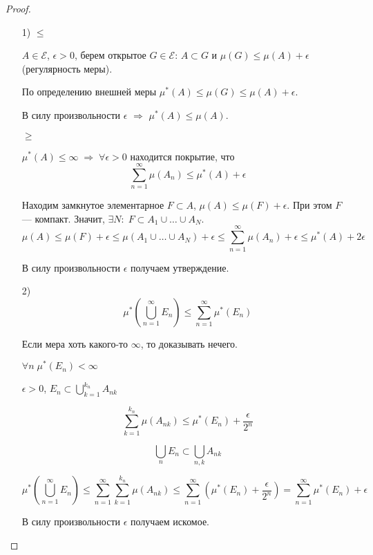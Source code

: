 \begin{proof}
  \phantom{123}\par
  \begin{itemize}
  \item[1)] \textbf{$\leq$} 
  
  $A \in \mathcal{E}$, $\epsilon > 0$, берем открытое $G \in \mathcal{E}$: $A\subset G$ и 
  $\mu(G) \leq \mu(A) + \epsilon$ (регулярность меры).

  По определению внешней меры $\mu^*(A) \leq \mu(G) \leq \mu(A) + \epsilon$.
  
  В силу произвольности $\epsilon$ $\Rightarrow$ $\mu^*(A) \leq \mu(A)$.

  \vspace{2mm}
  \textbf{$\geq$} 
  
  $\mu^*(A) \leq \infty \; \Rightarrow\; \forall \epsilon > 0$ находится покрытие, что 
  $$\sum_{n=1}^{\infty} \mu(A_n) \leq \mu^*(A) + \epsilon$$

  Находим замкнутое элементарное $F \subset A$, $\mu(A) \leq \mu(F) + \epsilon$.
  При этом $F$ --- компакт. Значит, $\exists N: \; F \subset A_1 \cup \ldots \cup A_N$.
  $$\mu(A) \leq \mu(F) + \epsilon \leq \mu(A_1 \cup \ldots \cup A_N) + \epsilon \leq \sum_{n = 1}^{\infty} \mu(A_n) + \epsilon \leq \mu^*(A) + 2\epsilon$$

  В силу произвольности $\epsilon$ получаем утверждение.

  \vspace{2mm}
  \item[2)] $$\mu^*\left(\bigcup_{n = 1}^{\infty} E_n\right) \leq \sum_{n = 1}^{\infty} \mu^*(E_n)$$
  
  Если мера хоть какого-то $\infty$, то доказывать нечего.

  $\forall n \; \mu^*(E_n) < \infty$

  $\epsilon>0$, $E_n \subset \bigcup_{k = 1}^{k_n} A_{nk}$

  $$\sum_{k = 1}^{k_n} \mu(A_{nk}) \leq \mu^*(E_n) + \frac{\epsilon}{2^n}$$

  $$\bigcup_n E_n \subset \bigcup_{n, k} A_{nk}$$

  $$\mu^*\left(\bigcup_{n = 1}^{\infty} E_n\right) \leq \sum_{n = 1}^{\infty} \sum_{k = 1}^{k_n} \mu(A_{nk}) \leq \sum_{n=1}^{\infty}\left( \mu^*(E_n) + \frac{\epsilon}{2^n}\right) = \sum_{n = 1}^{\infty} \mu^*(E_n) + \epsilon$$

  В силу произвольности $\epsilon$ получаем искомое.
  \end{itemize}
\end{proof}

